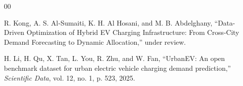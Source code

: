 \documentclass[conference]{IEEEtran}
\begin{document}

\begin{thebibliography}{00}


R. Kong, A. S. Al‑Sumaiti, K. H. Al Hosani, and M. B. Abdelghany,
``Data-Driven Optimization of Hybrid EV Charging Infrastructure: From Cross-City Demand Forecasting to Dynamic Allocation,'' under review.

 H. Li, H. Qu, X. Tan, L. You, R. Zhu, and W. Fan, ``UrbanEV: An open benchmark dataset for urban electric vehicle charging demand prediction,'' \textit{Scientific Data}, vol. 12, no. 1, p. 523, 2025.


\end{thebibliography}
\end{document}
